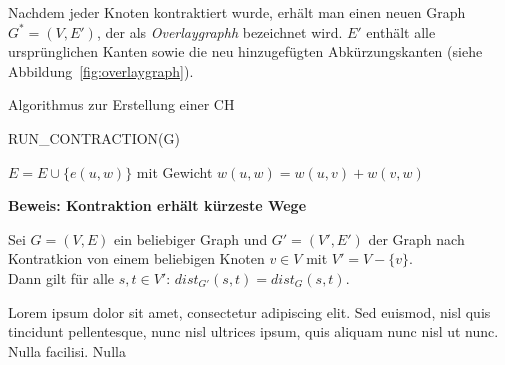 Nachdem jeder Knoten kontraktiert wurde, erhält man einen neuen Graph  ${G^{*} = (V,E')}$, der als
\emph{Overlaygraphh} bezeichnet wird. $E'$ enthält alle ursprünglichen Kanten sowie die neu
hinzugefügten Abkürzungskanten (siehe Abbildung~\ref{fig:overlaygraph}).

Algorithmus zur Erstellung einer \ac{CH}

\begin{algorithm}[H]
    \caption{RUN\_CONTRACTION(G)}
    \label{algo:contraction}
    \begin{algorithmic}
        \State $E = E \cup \{e(u,w)\}$ mit Gewicht ${w(u,w) = w(u,v) + w(v,w)}$
        \EndIf
        \EndFor
        \EndFor
        \EndFor
    \end{algorithmic}
\end{algorithm}

\textbf{Beweis: Kontraktion erhält kürzeste Wege}
\begin{lemma}
    Sei $G = (V,E)$ ein beliebiger Graph und $G' = (V',E')$ der Graph nach Kontratkion von einem
    beliebigen Knoten $v \in V$ mit $V' = V - \{v\}$.\\
    Dann gilt für alle $s,t \in V'$: ${dist_{G'}(s,t) = dist_{G}(s,t)}$.
\end{lemma}
Lorem ipsum dolor sit amet, consectetur adipiscing elit. Sed euismod, nisl quis tincidunt
pellentesque, nunc nisl ultrices ipsum, quis aliquam nunc nisl ut nunc. Nulla facilisi. Nulla


